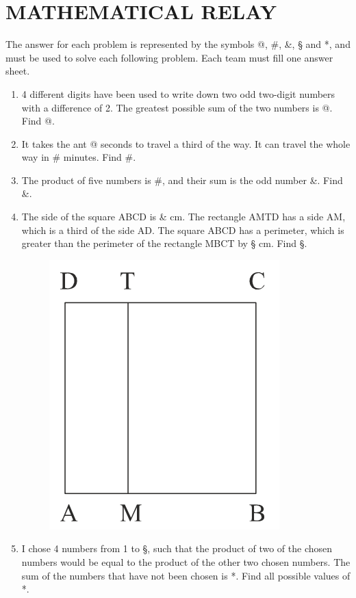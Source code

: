 \documentclass[11pt]{scrartcl}
\begin{document}
\section*{MATHEMATICAL RELAY}
The answer for each problem is represented by the symbols @, \#, \&, § and *, and must be used to solve each following problem. Each team must fill one answer sheet.

\begin{enumerate}[resume]
\item 4 different digits have been used to write down two odd two-digit numbers with a difference of 2. The greatest possible sum of the two numbers is @. Find @.

\item It takes the ant @ seconds to travel a third of the way. It can travel the whole way in \# minutes. Find \#.

\item The product of five numbers is \#, and their sum is the odd number \&. Find \&.

\item The side of the square ABCD is \& cm. The rectangle AMTD has a side AM, which is a third of the side AD. The square ABCD has a perimeter, which is greater than the perimeter of the rectangle MBCT by § cm. Find §.
\begin{figure}[h]
    \centering
    \includegraphics[scale=0.5]{StarGen/0Figure/square-mwb.png}
\end{figure}

\item I chose 4 numbers from 1 to §, such that the product of two of the chosen numbers would be equal to the product of the other two chosen numbers. The sum of the numbers that have not been chosen is *. Find all possible values of *.
\end{enumerate}
\end{document}
